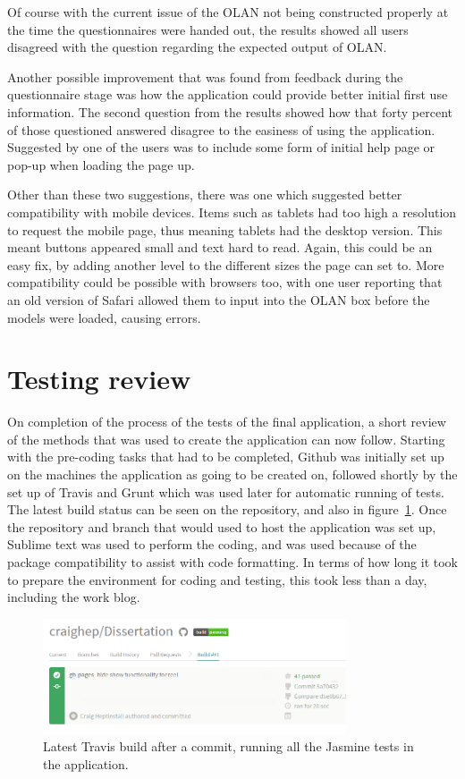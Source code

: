 Of course with the current issue of the OLAN not being constructed properly at the time the questionnaires were handed out, the results showed all users disagreed with the question regarding the expected output of OLAN.

Another possible improvement that was found from feedback during the questionnaire stage was how the application could provide better initial first use information. The second question from the results showed how that forty percent of those questioned answered disagree to the easiness of using the application. Suggested by one of the users was to include some form of initial help page or pop-up when loading the page up. 

Other than these two suggestions, there was one which suggested better compatibility with mobile devices. Items such as tablets had too high a resolution to request the mobile page, thus meaning tablets had the desktop version. This meant buttons appeared small and text hard to read. Again, this could be an easy fix, by adding another level to the different sizes the page can set to. More compatibility could be possible with browsers too, with one user reporting that an old version of Safari allowed them to input into the OLAN box before the models were loaded, causing errors. 

\section{Testing review}
On completion of the process of the tests of the final application, a short review of the methods that was used to create the application can now follow. Starting with the pre-coding tasks that had to be completed, Github was initially set up on the machines the application as going to be created on, followed shortly by the set up of Travis and Grunt which was used later for automatic running of tests. The latest build status can be seen on the repository, and also in figure~\ref{fig:travis}. Once the repository and branch that would used to host the application was set up, Sublime text was used to perform the coding, and was used because of the package compatibility to assist with code formatting. In terms of how long it took to prepare the environment for coding and testing, this took less than a day, including the work blog.

\begin{figure}[h!]
  \centering
      \includegraphics[width=0.8\textwidth]{images/travis.png}
  \caption{Latest Travis build after a commit, running all the Jasmine tests in the application.}
  \label{fig:travis}
\end{figure}

